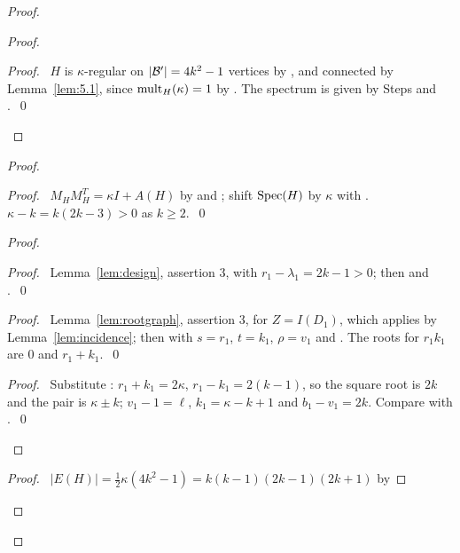 \begin{proof}
\begin{proof}
  \qedstep
  \begin{proof}\pf\ $H$ is $\kappa$-regular on $|{\mathcal B}'|=4k^2-1$ vertices by , and
   connected by Lemma~\ref{lem:5.1}, since $\mathop{\mathrm{mult}}\nolimits_H(\kappa)=1$ by
   . The spectrum is given by Steps  and
   .~\qed\end{proof}
 \end{proof}
 \begin{proof}
  \begin{proof}\pf\ $M_HM_H^T=\kappa I+A(H)$ by  and ; shift
   $\mathop{\mathrm{Spec}}\nolimits(H)$ by $\kappa$ with . $\kappa-k=k(2k-3)>0$ as $k\ge2$.~\qed\end{proof}
  \begin{proof}
   \begin{proof}\pf\ Lemma~\ref{lem:design}, assertion 3, with $r_1-\lambda_1=2k-1>0$; then
     and .~\qed\end{proof}
   \begin{proof}\pf\ Lemma~\ref{lem:rootgraph}, assertion 3, for $Z=I(D_1)$, which applies by
    Lemma~\ref{lem:incidence}; then  with $s=r_1$, $t=k_1$, $\rho=v_1$ and
    . The roots for $r_1k_1$ are $0$ and $r_1+k_1$.~\qed\end{proof}
   \qedstep
   \begin{proof}\pf\ Substitute : $r_1+k_1=2\kappa$, $r_1-k_1=2(k-1)$, so the square
    root is $2k$ and the pair is $\kappa\pm k$; $v_1-1=\ell$, $k_1=\kappa-k+1$ and
    $b_1-v_1=2k$. Compare with .~\qed\end{proof}
  \end{proof}
  \begin{proof}\pf\ $|E(H)|=\frac12\kappa(4k^2-1)=k(k-1)(2k-1)(2k+1)$ by

\end{proof}
\end{proof}
\end{proof}
